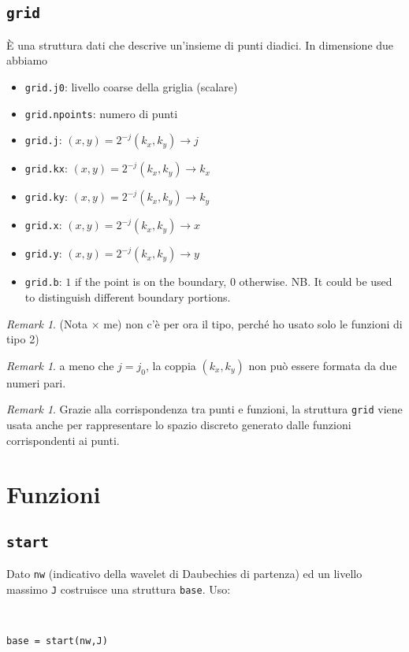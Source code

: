 \documentclass{amsart}
\theoremstyle{definition}
\theoremstyle{remark}
\newtheorem{rem}[thm]{Remark}
\numberwithin{equation}{section}
\begin{document}
\subsection*{\tt grid} \`E una struttura dati che descrive un'insieme di punti diadici. In dimensione due abbiamo
\begin{itemize}
    \item {\tt grid.j0}: livello coarse della griglia (scalare)
    \item {\tt grid.npoints}: numero di punti
    \item {\tt grid.j}: $(x,y)=2^{-j}(k_x,k_y) \rightarrow j$
    \item {\tt grid.kx}: $(x,y)=2^{-j}(k_x,k_y) \rightarrow k_x$
    \item {\tt grid.ky}: $(x,y)=2^{-j}(k_x,k_y) \rightarrow k_y$
    \item {\tt grid.x}: $(x,y)=2^{-j}(k_x,k_y) \rightarrow x$
    \item {\tt grid.y}: $(x,y)=2^{-j}(k_x,k_y) \rightarrow y$
    \item {\tt grid.b}: $1$ if the point is on the boundary, $0$ otherwise. NB. It could be used to distinguish different boundary portions.
\end{itemize}
\begin{rem}(Nota $\times$ me) non c'\`e per ora il tipo, perch\'e ho usato solo le funzioni di tipo 2)\end{rem}
\begin{rem} a meno che $j=j_0$, la coppia $(k_x,k_y)$ non pu\`o essere formata da due numeri pari. \end{rem}
\begin{rem} Grazie alla corrispondenza tra punti e funzioni, la struttura {\tt grid} viene usata anche per rappresentare lo spazio discreto generato dalle funzioni corrispondenti ai punti.\end{rem}

\section{Funzioni}

\subsection*{\tt start} Dato {\tt nw} (indicativo della wavelet di Daubechies di partenza) ed un livello massimo {\tt J} costruisce una struttura {\tt base}. Uso:

\

{\tt base = start(nw,J)}
\end{document}
